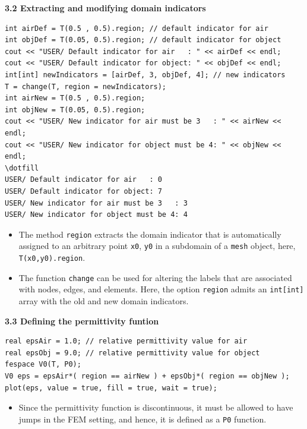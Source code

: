 \documentclass[9pt]{amsart}
\theoremstyle{remark}
\theoremstyle{definition}
\begin{document}
\vspace*{0.2cm}
\textbf{3.2 Extracting and modifying domain indicators}
\begin{Verbatim}[commandchars=\\\{\}]
int airDef = T(0.5 , 0.5).region; // default indicator for air
int objDef = T(0.05, 0.5).region; // default indicator for object
cout << "USER/ Default indicator for air   : " << airDef << endl;
cout << "USER/ Default indicator for object: " << objDef << endl;
int[int] newIndicators = [airDef, 3, objDef, 4]; // new indicators
T = change(T, region = newIndicators);
int airNew = T(0.5 , 0.5).region;
int objNew = T(0.05, 0.5).region;
cout << "USER/ New indicator for air must be 3   : " << airNew << endl;
cout << "USER/ New indicator for object must be 4: " << objNew << endl;
\dotfill
USER/ Default indicator for air   : 0
USER/ Default indicator for object: 7
USER/ New indicator for air must be 3   : 3
USER/ New indicator for object must be 4: 4
\end{Verbatim}

\begin{itemize}
\item The method \verb!region! extracts the domain indicator that is automatically assigned to an arbitrary point \verb!x0!, \verb!y0! in a subdomain of a \verb!mesh! object, here, \verb!T(x0,y0).region!. 
\item The function \verb!change! can be used for altering the labels that are associated with nodes, edges, and elements. Here, the option \verb!region! admits an \verb!int[int]! array with the old and new domain indicators.
\end{itemize}

\vspace*{0.2cm}
\textbf{3.3 Defining the permittivity funtion}
\begin{Verbatim}[commandchars=\\\{\}]
real epsAir = 1.0; // relative permittivity value for air
real epsObj = 9.0; // relative permittivity value for object
fespace V0(T, P0);
V0 eps = epsAir*( region == airNew ) + epsObj*( region == objNew );
plot(eps, value = true, fill = true, wait = true);
\end{Verbatim}

\begin{itemize}
\item Since the permittivity function is discontinuous, it must be allowed to have jumps in the FEM setting, and hence, it is defined as a \verb!P0! function.
\end{itemize}
\end{document}
